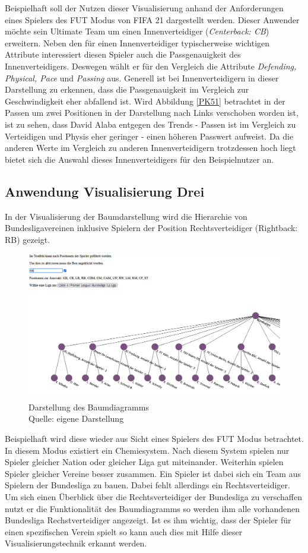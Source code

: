 \documentclass[usegeometry=true]{scrartcl}
\begin{document}
Beispielhaft soll der Nutzen dieser Visualisierung anhand der Anforderungen eines Spielers des FUT Modus von FIFA 21 dargestellt werden.
Dieser Anwender möchte sein Ultimate Team um einen Innenverteidiger (\textit{Centerback: CB}) erweitern. Neben den für einen Innenverteidiger typischerweise wichtigen Attribute interessiert diesen Spieler auch die Passgenauigkeit des Innenverteidigers. Deswegen wählt er für den Vergleich die Attribute \textit{Defending, Physical, Pace} und \textit{Passing} aus. Generell ist bei Innenverteidigern in dieser Darstellung zu erkennen, dass die Passgenauigkeit im Vergleich zur Geschwindigkeit eher abfallend ist. Wird Abbildung \ref{PK51} betrachtet in der Passen um zwei Positionen in der Darstellung nach Links verschoben worden ist, ist  zu sehen, dass David Alaba entgegen des Trends - Passen ist im Vergleich zu Verteidigen und Physis eher geringer - einen höheren Passwert aufweist. Da die anderen Werte im Vergleich zu anderen Innenverteidigern trotzdessen hoch liegt bietet sich die Auswahl dieses Innenverteidigers für den Beispielnutzer an.
\subsection{Anwendung Visualisierung Drei}
In der Visualisierung der Baumdarstellung wird die Hierarchie von Bundesligavereinen inklusive Spielern der Position Rechtsverteidiger (Rightback: RB) gezeigt.
\begin{figure}[h!]
\centering
\includegraphics[scale=0.6]{grafiken/Baumdiagramm5}
\caption{Darstellung des Baumdiagramms\\ Quelle: eigene Darstellung}
\label{BD5}
\end{figure}

Beispielhaft wird diese wieder aus Sicht eines Spielers des FUT Modus betrachtet. In diesem Modus existiert ein Chemiesystem. Nach diesem System spielen nur Spieler gleicher Nation oder gleicher Liga gut miteinander. Weiterhin spielen Spieler gleicher Vereine besser zusammen. Ein Spieler ist dabei sich ein Team aus Spielern der Bundesliga zu bauen. Dabei fehlt allerdings ein Rechtsverteidiger. Um sich einen Überblick über die Rechtsverteidiger der Bundesliga zu verschaffen nutzt er die Funktionalität des Baumdiagramms so werden ihm alle vorhandenen Bundesliga Rechstverteidiger angezeigt. Ist es ihm wichtig, dass der Spieler für einen spezifischen Verein spielt so kann auch dies mit Hilfe dieser Visualisierungstechnik erkannt werden.
\end{document}
